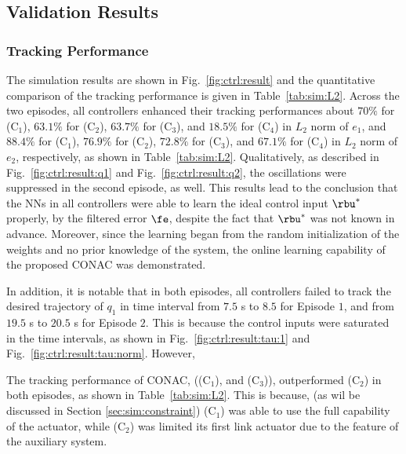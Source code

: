 \documentclass[lettersize,journal]{IEEEtran}
\begin{document}
\subsection{Validation Results}

\subsubsection{Tracking Performance}

The simulation results are shown in Fig.~\ref{fig:ctrl:result} and the quantitative comparison of the tracking performance is given in Table~\ref{tab:sim:L2}.
Across the two episodes, all controllers enhanced their tracking performances about $70 \%$ for (C$_1$), $63.1 \%$ for (C$_2$), $63.7 \%$ for (C$_3$), and $18.5 \%$ for (C$_4$) in $L_2$ norm of $e_1$, and $88.4 \%$ for (C$_1$), $76.9 \%$ for (C$_2$), $72.8 \%$ for (C$_3$), and $67.1 \%$ for (C$_4$) in $L_2$ norm of $e_2$, respectively, as shown in Table~\ref{tab:sim:L2}.
Qualitatively, as described in Fig.~\ref{fig:ctrl:result:q1} and Fig.~\ref{fig:ctrl:result:q2}, the oscillations were suppressed in the second episode, as well.
This results lead to the conclusion that the NNs in all controllers were able to learn the ideal control input $\rbu^*$ properly, by the filtered error $\fe$, despite the fact that $\rbu^*$ was not known in advance.
Moreover, since the learning began from the random initialization of the weights and no prior knowledge of the system, the online learning capability of the proposed CONAC was demonstrated.

In addition, it is notable that in both episodes, all controllers failed to track the desired trajectory of $q_1$ in time interval from $7.5$ s to $8.5$ for Episode $1$, and from $19.5$ s to $20.5$ s for Episode $2$.
This is because the control inputs were saturated in the time intervals, as shown in Fig.~\ref{fig:ctrl:result:tau:1} and Fig.~\ref{fig:ctrl:result:tau:norm}.
However, 

The tracking performance of CONAC, (\ie (C$_1$), and (C$_3$)), outperformed (C$_2$) in both episodes, as shown in Table~\ref{tab:sim:L2}.
This is because, (as wil be discussed in Section \ref{sec:sim:constraint}) (C$_1$) was able to use the full capability of the actuator, while (C$_2$) was limited its first link actuator due to the feature of the auxiliary system.

\end{document}
